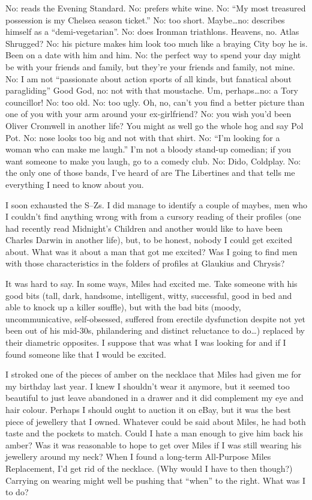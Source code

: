 No: reads the {\twelvesl Evening Standard}. No: prefers white wine.
No: ``My most treasured possession is my Chelsea season ticket.''
No: too short. Maybe\dots no: describes himself as a
``demi-vegetarian''. No: does Ironman triathlons. Heavens, no.
{\twelvesl Atlas Shrugged\/}? No: his picture makes him look too
much like a braying City boy he is. Been on a date with him {\twelveit and\/} him.
No: the perfect way to spend your day might be with your friends and
family, but they're your friends and family, not mine. No: I am not
``passionate about action sports of all kinds, but fanatical about
paragliding'' Good God, no: not with that moustache. Um,
perhaps\dots no: a Tory councillor! No: too old. No: too ugly. Oh,
no, can't you find a better picture than one of you with your arm
around your ex-girlfriend? No: you wish you'd been Oliver Cromwell in
another life? You might as well go the whole hog and say Pol Pot.
No: nose looks too big and not with that shirt. No: ``I'm looking
for a woman who can make me laugh.'' I'm not a bloody stand-up
comedian; if you want someone to make you laugh, go to a comedy
club. No: Dido, Coldplay. No: the only one of those bands, I've
heard of are The Libertines and that tells me everything I need to
know about you.

I soon exhausted the S--Zs. I did manage to identify a couple of
maybes, men who I couldn't find anything wrong with from a cursory
reading of their profiles (one had recently read {\twelvesl
Midnight's  Children\/} and another would like to have been Charles
Darwin in another life), but, to be honest, nobody I could get
excited about. What was it about a man that got me excited? Was I
going to find men with those characteristics in the folders of
profiles at Glaukius and Chrysis?

It was hard to say. In some ways, Miles had excited me. Take someone
with his good bits (tall, dark, handsome, intelligent, witty,
successful, good in bed and able to knock up a killer souffle), but
with the bad bits (moody, uncommunicative, self-obsessed, suffered
from erectile dysfunction despite not yet been out of his mid-30s, philandering and distinct reluctance to
do\dots) replaced by their diametric opposites. I suppose that was
what I was looking for and if I found someone like that I would be
excited.

I stroked one of the pieces of amber on the necklace that Miles had
given me for my birthday last year. I knew I shouldn't wear it
anymore, but it seemed too beautiful to just leave abandoned in a
drawer and it did complement my eye and hair colour. Perhaps I
should ought to auction it on eBay, but it was the best piece of
jewellery that I owned. Whatever could be said about Miles, he had
both taste and the pockets to match. Could I hate a man enough to
give him back his amber? Was it was reasonable to hope to get over
Miles if I was still wearing his jewellery around my neck? When I
found a long-term All-Purpose Miles Replacement, I'd get rid of the
necklace. (Why would I have to then though?) Carrying on wearing
might well be pushing that ``when'' to the right. What was I to do?

